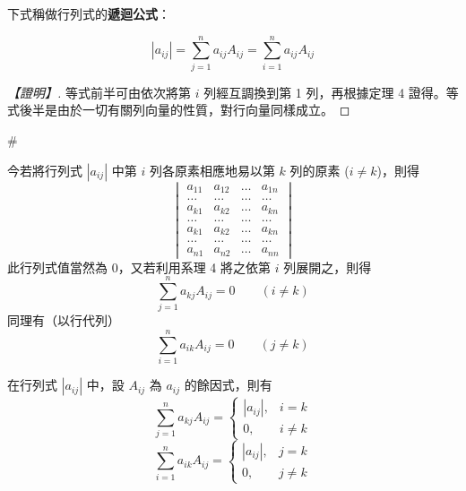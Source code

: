 下式稱做行列式的\textbf{遞迴公式}：

\begin{corollary}\label{cor:b6s-1-5}
\begin{equation}
|a_{ij}| = \sum_{j=1}^n a_{ij} A_{ij} = \sum_{i=1}^n a_{ij} A_{ij} \label{eq:b6s-1-6-15}
\end{equation}
\end{corollary}

\begin{proof}[【證明】]
等式前半可由依次將第 $i$ 列經互調換到第 1 列，再根據定理 4 證得。等式後半是由於一切有關列向量的性質，對行向量同樣成立。
\end{proof}\hfill$\#$

今若將行列式 $|a_{ij}|$ 中第 $i$ 列各原素相應地易以第 $k$ 列的原素 ($i \ne k$)，則得
\begin{equation}
\begin{vmatrix}
a_{11} & a_{12} & \dots & a_{1n} \\
\dots & \dots & \dots & \dots \\
a_{k1} & a_{k2} & \dots & a_{kn} \\
\dots & \dots & \dots & \dots \\
a_{k1} & a_{k2} & \dots & a_{kn} \\
\dots & \dots & \dots & \dots \\
a_{n1} & a_{n2} & \dots & a_{nn}
\end{vmatrix} \label{eq:b6s-1-6-16}
\end{equation}
此行列式值當然為 0，又若利用系理 4 將之依第 $i$ 列展開之，則得
\[ \sum_{j=1}^n a_{kj} A_{ij} = 0 \qquad (i \ne k) \]
同理有（以行代列）
\[ \sum_{i=1}^n a_{ik} A_{ij} = 0 \qquad (j \ne k) \]

\begin{theorem}\label{thm:b6s-1-16}
在行列式 $|a_{ij}|$ 中，設 $A_{ij}$ 為 $a_{ij}$ 的餘因式，則有
\begin{equation}
\sum_{j=1}^n a_{kj} A_{ij} = \begin{cases}
|a_{ij}|, & i = k \\
0, & i \ne k
\end{cases} \label{eq:b6s-1-6-17}
\end{equation}
\begin{equation}
\sum_{i=1}^n a_{ik} A_{ij} = \begin{cases}
|a_{ij}|, & j = k \\
0, & j \ne k
\end{cases} \label{eq:b6s-1-6-18}
\end{equation}
\end{theorem}

